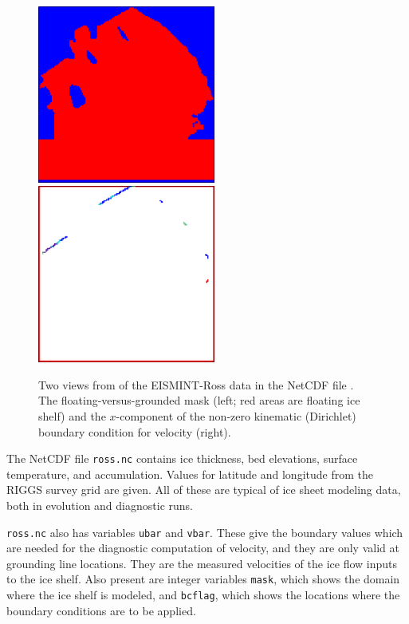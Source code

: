 \documentclass[11pt,final]{amsart}
\begin{document}
\begin{figure}[ht]
\includegraphics[height=2.3in,keepaspectratio=true]{figs/rossmask} \qquad \includegraphics[height=2.3in,keepaspectratio=true]{figs/rossubar}
\caption{Two views from  of the EISMINT-Ross data in the NetCDF file .  The floating-versus-grounded mask (left; red areas are floating ice shelf) and the $x$-component of the non-zero kinematic (Dirichlet) boundary condition for velocity (right).}
\label{fig:rossmaskubar}
\end{figure}

The NetCDF file \verb|ross.nc| contains ice thickness, bed elevations, surface temperature, and accumulation.  Values for latitude and longitude from the RIGGS survey grid \cite{RIGGS1} are given.  All of these are typical of ice sheet modeling data, both in evolution and diagnostic runs.

\verb|ross.nc| also has variables \verb|ubar| and \verb|vbar|.  These give the boundary values which are needed for the diagnostic computation of velocity, and they are only valid at grounding line locations.  They are the measured velocities of the ice flow inputs to the ice shelf.  Also present are integer variables \verb|mask|, which shows the domain where the ice shelf is modeled, and \verb|bcflag|, which shows the locations where the boundary conditions are to be applied.
\end{document}
